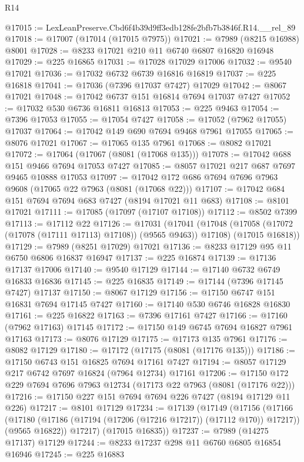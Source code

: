 \begin{lexlean}{R14}
\begin{coremodule}
@17015 := LexLeanPreserve.Cbd6f4b39d9ff3edb128fe2bfb7b3846f.R14.__rel_89
@17018 := @17007 (@17014 (@17015 @7975))
@17021 := @7989 (@8215 @16988) @8001
@17028 := @8233 @17021 @210 @11 @6740 @6807 @16820 @16948
@17029 := @225 @16865
@17031 := @17028 @17029 @17006
@17032 := @9540 @17021
@17036 := @17032 @6732 @6739 @16816 @16819
@17037 := @225 @16818
@17041 := @17036 (@7396 @17037 @7427) @17029
@17042 := @8067 @17021
@17048 := @17042 @6737 @151 @16814 @7694 @17037 @7427
@17052 := @17032 @530 @6736 @16811 @16813
@17053 := @225 @9463
@17054 := @7396 @17053
@17055 := @17054 @7427
@17058 := @17052 (@7962 @17055) @17037
@17064 := @17042 @149 @690 @7694 @9468 @7961 @17055
@17065 := @8076 @17021
@17067 := @17065 @135 @7961
@17068 := @8082 @17021
@17072 := @17064 (@17067 (@8081 (@17068 @135)))
@17078 := @17042 @688 @151 @9466 @7694 @17053 @7427
@17085 := @8057 @17021 @217 @687 @7697 @9465 @10888 @17053
@17097 := @17042 @172 @686 @7694 @7696 @7963 @9608 (@17065 @22 @7963 (@8081 (@17068 @22)))
@17107 := @17042 @684 @151 @7694 @7694 @683 @7427 (@8194 @17021 @11 @683)
@17108 := @8101 @17021
@17111 := @17085 (@17097 (@17107 @17108))
@17112 := @8502 @7399
@17113 := @17112 @22
@17126 := @17031
    (@17041
      (@17048 (@17058 (@17072 (@17078 (@17111 @17113) @17108)) (@9565 @9463)) @17108)
      (@17015 @16818))
@17129 := @7989 (@8251 @17029) @17021
@17136 := @8233 @17129 @95 @11 @6750 @6806 @16837 @16947
@17137 := @225 @16874
@17139 := @17136 @17137 @17006
@17140 := @9540 @17129
@17144 := @17140 @6732 @6749 @16833 @16836
@17145 := @225 @16835
@17149 := @17144 (@7396 @17145 @7427) @17137
@17150 := @8067 @17129
@17156 := @17150 @6747 @151 @16831 @7694 @17145 @7427
@17160 := @17140 @530 @6746 @16828 @16830
@17161 := @225 @16822
@17163 := @7396 @17161 @7427
@17166 := @17160 (@7962 @17163) @17145
@17172 := @17150 @149 @6745 @7694 @16827 @7961 @17163
@17173 := @8076 @17129
@17175 := @17173 @135 @7961
@17176 := @8082 @17129
@17180 := @17172 (@17175 (@8081 (@17176 @135)))
@17186 := @17150 @6743 @151 @16825 @7694 @17161 @7427
@17194 := @8057 @17129 @217 @6742 @7697 @16824 (@7964 @12734) @17161
@17206 := @17150 @172 @229 @7694 @7696 @7963 @12734 (@17173 @22 @7963 (@8081 (@17176 @22)))
@17216 := @17150 @227 @151 @7694 @7694 @226 @7427 (@8194 @17129 @11 @226)
@17217 := @8101 @17129
@17234 := @17139
    (@17149
      (@17156
        (@17166
          (@17180 (@17186 (@17194 (@17206 (@17216 @17217)) (@17112 @170)) @17217))
          (@9565 @16822))
        @17217)
      (@17015 @16835))
@17237 := @7989 (@14275 @17137) @17129
@17244 := @8233 @17237 @298 @11 @6760 @6805 @16854 @16946
@17245 := @225 @16883

\end{coremodule}
\end{lexlean}
